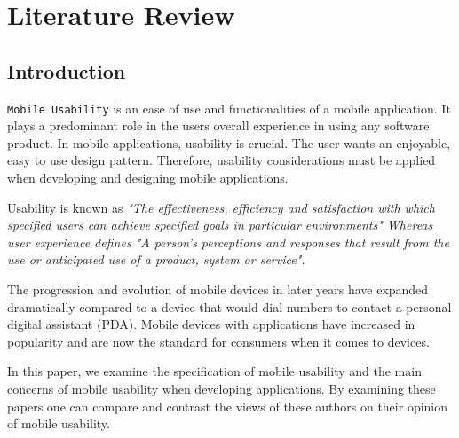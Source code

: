 \documentclass[runningheads,a4paper]{llncs}
\begin{document}
\section{Literature Review}
\begin{inparaenum}[]
\subsection{Introduction}
{\texttt{Mobile Usability}} is an ease of use and functionalities of a mobile application. It plays a predominant role in the users overall experience in using any software product. In mobile applications, usability is crucial. The user wants an enjoyable, easy to use design pattern. Therefore, usability considerations must be applied when developing and designing mobile applications.
\cite{martinazzo2008testing}

 Usability is known as
\it"The effectiveness, efficiency and satisfaction with which specified users can achieve specified goals in particular environments"\cite{gunduz2012usability}
\rm Whereas user experience defines
\it "A person's perceptions and responses that result from the use or anticipated use of a product, system or service".\cite{gunduz2012usability}

\rm The progression and evolution of mobile devices in later years have expanded dramatically compared to a device that would dial numbers to contact a personal digital assistant (PDA). Mobile devices with applications have increased in popularity and are now the standard for consumers when it comes to devices. 
\cite{lee2004developing}
\end{inparaenum}

\begin{inparaenum}[]

\end{inparaenum}
In this paper, we examine the specification of mobile usability and the main concerns of mobile usability when developing applications. By examining these papers one can compare and contrast the views of these authors on their opinion of mobile usability.
 
\end{document}
